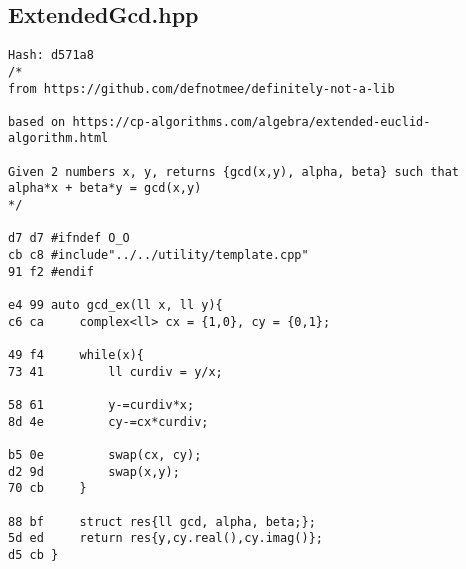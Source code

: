 \documentclass[11pt, a4paper, twoside]{article}
\begin{document}
\subsection{ExtendedGcd.hpp}
\begin{lstlisting}
Hash: d571a8
/*
from https://github.com/defnotmee/definitely-not-a-lib

based on https://cp-algorithms.com/algebra/extended-euclid-algorithm.html

Given 2 numbers x, y, returns {gcd(x,y), alpha, beta} such that alpha*x + beta*y = gcd(x,y)
*/

d7 d7 #ifndef O_O
cb c8 #include"../../utility/template.cpp"
91 f2 #endif

e4 99 auto gcd_ex(ll x, ll y){
c6 ca     complex<ll> cx = {1,0}, cy = {0,1};
      
49 f4     while(x){
73 41         ll curdiv = y/x;
      
58 61         y-=curdiv*x;
8d 4e         cy-=cx*curdiv;
      
b5 0e         swap(cx, cy);
d2 9d         swap(x,y);
70 cb     }
      
88 bf     struct res{ll gcd, alpha, beta;};
5d ed     return res{y,cy.real(),cy.imag()};
d5 cb }
\end{lstlisting}
\end{document}
